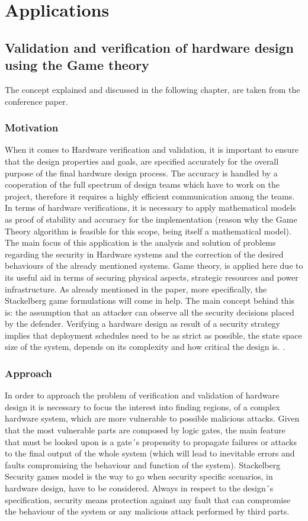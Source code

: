 \documentclass[conference]{IEEEtran}
\begin{document}
\section{Applications}
\subsection{Validation and verification of hardware design using the Game theory}
The concept explained and discussed in the following chapter, are taken from the conference paper.\cite{b9}
\subsubsection{Motivation}
When it comes to Hardware verification and validation, it is important to ensure that the design properties and goals, are specified accurately for the overall purpose of the final hardware design process. The accuracy is handled by a cooperation of the full spectrum of design teams which have to work on the project, therefore it requires a highly efficient communication among the teams. In terms of hardware verifications, it is necessary to apply mathematical models as proof of stability and accuracy for the implementation (reason why the Game Theory algorithm is feasible for this scope, being itself a mathematical model). The main focus of this application is the analysis and solution of problems regarding the security in Hardware systems and the correction of the desired behaviours of the already mentioned systems.
Game theory, is applied here due to its useful aid in terms of securing physical aspects, strategic resources and power infrastructure. As already mentioned in the paper, more specifically, the Stackelberg game formulations will come in help. The main concept behind this is: the assumption that an attacker can observe all the security decisions placed by the defender. Verifying a hardware design as result of a security strategy implies that deployment schedules need to be as strict as possible, the state space size of the system, depends on its complexity and how critical the design is.
. 
\subsubsection{Approach}
In order to approach the problem of verification and validation of hardware design it is necessary to focus the interest into finding regions, of a complex hardware system, which are more vulnerable to possible malicious attacks. Given that the most vulnerable parts are composed by logic gates, the main feature that must be looked upon is a gate´s propensity to propagate failures or attacks to the final output of the whole system (which will lead to inevitable errors and faults compromising the behaviour and function of the system).
Stackelberg Security games model is the way to go when security specific scenarios, in hardware design, have to be considered. Always in respect to the design´s specification, security means protection against any fault that can compromise the behaviour of the system or any malicious attack performed by third parts.
\end{document}
